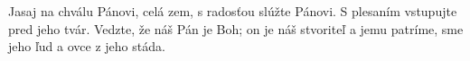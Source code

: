 Jasaj na chválu Pánovi, celá zem,
s radosťou slúžte Pánovi.
\versseparator
S plesaním vstupujte pred jeho tvár.
\versseparator
Vedzte, že náš Pán je Boh;
\versseparator
on je náš stvoriteľ a jemu patríme,
sme jeho ľud a ovce z jeho stáda.
